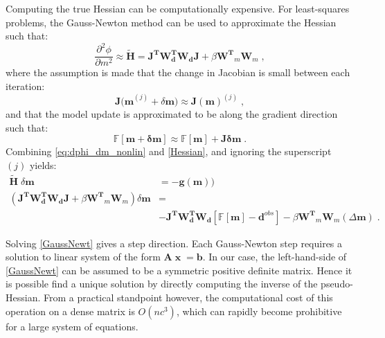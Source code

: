 Computing the true Hessian can be computationally expensive.
For least-squares problems, the Gauss-Newton method can be used to approximate the Hessian such that:
\begin{equation}\label{Hessian}
\frac{\partial^2 \phi}{\partial m^2} \approx \mathbf{\tilde H} =   \mathbf{J^T W_\text{d}^T W_\text{d} J} +  \beta \mathbf{W^T}_m \mathbf{W}_m \;,
\end{equation}
where the assumption is made that the change in Jacobian is small between each iteration:
\begin{equation}
\mathbf{J(m}^{(j)} + \delta \mathbf{m}) \approx \mathbf{J(m)}^{(j)}\;,
\end{equation}
and that the model update is approximated to be along the gradient direction such that:
\begin{equation}
\mathbf{\mathbb{F}[m + \delta m]} \approx \mathbb{F}[\mathbf{m}] + \mathbf{J \delta m}\;.
\end{equation}
Combining \ref{eq:dphi_dm_nonlin} and \ref{Hessian}, and ignoring the superscript $(j)$ yields:
\begin{equation}\label{GaussNewt}
\begin{aligned}
 \mathbf{\tilde H}\; \delta \mathbf{m} &= -\mathbf{g(m)})  \\
\left (\mathbf{J^T W_\text{d}^T W_\text{d} J} + \beta \mathbf{W^T}_m \mathbf{W}_m \right) \delta \mathbf{m} &= \\
&- \mathbf{J^T W_\text{d}^T W_\text{d}} \left[ \mathbb{F}[\mathbf{m}] -\mathbf{d}^{obs} \right] - \beta\mathbf{W^T}_m \mathbf{W}_m  \left( \Delta \mathbf{m} \right)\;.
\end{aligned}
\end{equation}

Solving \ref{GaussNewt} gives a step direction. 
Each Gauss-Newton step requires a solution to linear system of the form $\mathbf{A\;x\;=b}$.
In our case, the left-hand-side of \ref{GaussNewt} can be assumed to be a symmetric positive definite matrix. Hence it is possible find a unique solution by directly computing the inverse of the pseudo-Hessian. 
From a practical standpoint however, the computational cost of this operation on a dense matrix is $O(nc^3)$, which can rapidly become prohibitive for a large system of equations.

